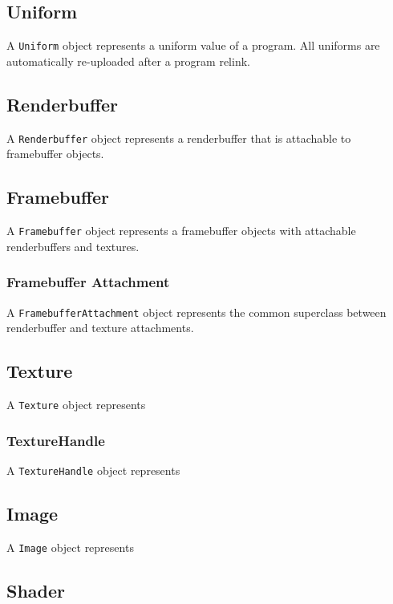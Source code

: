 \documentclass{article}
\begin{document}
\subsection{Uniform}

A \lstinline|Uniform| object represents a uniform value of a program. All uniforms are automatically re-uploaded after a program relink.

\subsection{Renderbuffer}

A \lstinline|Renderbuffer| object represents a renderbuffer that is attachable to framebuffer objects.

\subsection{Framebuffer}

A \lstinline|Framebuffer| object represents a framebuffer objects with attachable renderbuffers and textures.

\subsubsection{Framebuffer Attachment}

A \lstinline|FramebufferAttachment| object represents the common superclass between renderbuffer and texture attachments.

\subsection{Texture}

A \lstinline|Texture| object represents 

\subsubsection{TextureHandle}

A \lstinline|TextureHandle| object represents 

\subsection{Image}

A \lstinline|Image| object represents 

\subsection{Shader}
\end{document}
